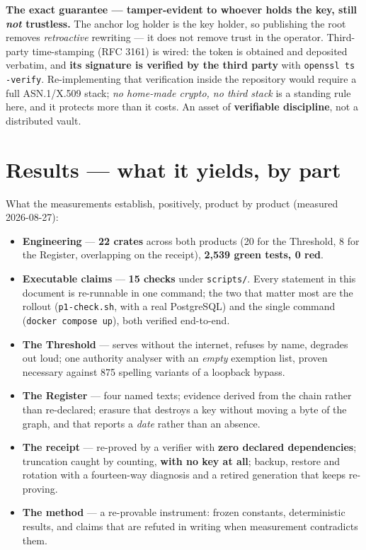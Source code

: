 \documentclass[11pt]{article}
\begin{document}
\begin{cadre}
\textbf{The exact guarantee --- tamper-evident to whoever holds the key, still \emph{not}
trustless.} The anchor log holder
is the key holder, so publishing the root removes \emph{retroactive} rewriting --- it does not remove
trust in the operator. Third-party time-stamping (RFC 3161) is wired: the token is obtained and
deposited verbatim, and \textbf{its signature is verified by the third party} with
\texttt{openssl ts -verify}. Re-implementing that verification inside the repository would require a
full ASN.1/X.509 stack; \emph{no home-made crypto, no third stack} is a standing rule here, and it
protects more than it costs. An asset of \textbf{verifiable discipline}, not a distributed vault.
\end{cadre}

\section{Results --- what it yields, by part}
What the measurements establish, positively, product by product (measured 2026-08-27):
\begin{itemize}[leftmargin=1.3em,itemsep=2.5pt,topsep=3pt,label=\textendash]
\item \textbf{Engineering} --- \textbf{22 crates} across both products (20 for the Threshold, 8 for
the Register, overlapping on the receipt), \textbf{2{,}539 green tests, 0 red}.
\item \textbf{Executable claims} --- \textbf{15 checks} under \texttt{scripts/}. Every statement in
this document is re-runnable in one command; the two that matter most are the rollout
(\texttt{p1-check.sh}, with a real PostgreSQL) and the single command
(\texttt{docker compose up}), both verified end-to-end.
\item \textbf{The Threshold} --- serves without the internet, refuses by name, degrades out loud;
one authority analyser with an \emph{empty} exemption list, proven necessary against 875 spelling
variants of a loopback bypass.
\item \textbf{The Register} --- four named texts; evidence derived from the chain rather than
re-declared; erasure that destroys a key without moving a byte of the graph, and that reports a
\emph{date} rather than an absence.
\item \textbf{The receipt} --- re-proved by a verifier with \textbf{zero declared dependencies};
truncation caught by counting, \textbf{with no key at all}; backup, restore and rotation with a
fourteen-way diagnosis and a retired generation that keeps re-proving.
\item \textbf{The method} --- a re-provable instrument: frozen constants, deterministic results, and
claims that are refuted in writing when measurement contradicts them.
\end{itemize}
\end{document}

